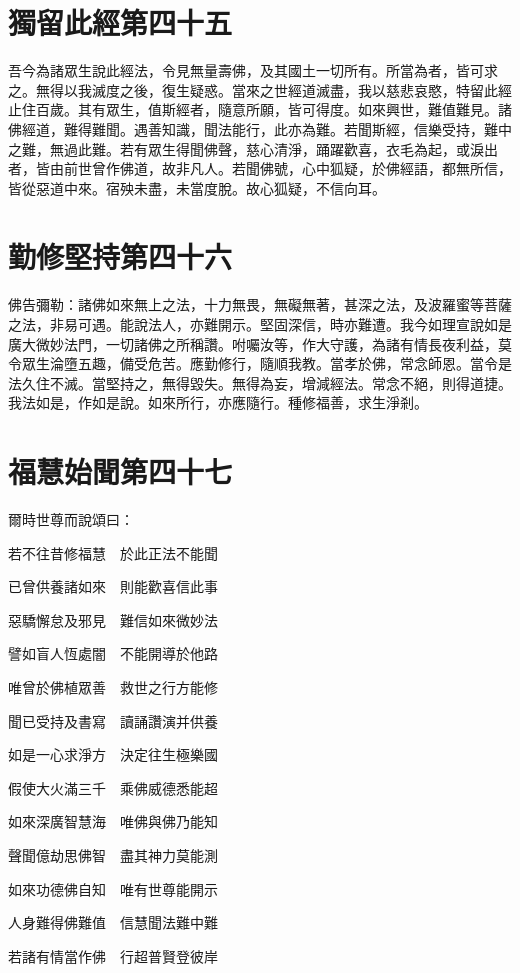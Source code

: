 \documentclass{zhvt-classic}
\begin{document}
\chapter*{獨留此經第四十五}

吾今為諸眾生說此經法，令見無量壽佛，及其國土一切所有。所當為者，皆可求之。無得以我滅度之後，復生疑惑。當來之世經道滅盡，我以慈悲哀愍，特留此經止住百歲。其有眾生，值斯經者，隨意所願，皆可得度。如來興世，難值難見。諸佛經道，難得難聞。遇善知識，聞法能行，此亦為難。若聞斯經，信樂受持，難中之難，無過此難。若有眾生得聞佛聲，慈心清淨，踊躍歡喜，衣毛為起，或淚出者，皆由前世曾作佛道，故非凡人。若聞佛號，心中狐疑，於佛經語，都無所信，皆從惡道中來。宿殃未盡，未當度脫。故心狐疑，不信向耳。

\chapter*{勤修堅持第四十六}

佛告彌勒：諸佛如來無上之法，十力無畏，無礙無著，甚深之法，及波羅蜜等菩薩之法，非易可遇。能說法人，亦難開示。堅固深信，時亦難遭。我今如理宣說如是廣大微妙法門，一切諸佛之所稱讚。咐囑汝等，作大守護，為諸有情長夜利益，莫令眾生淪墮五趣，備受危苦。應勤修行，隨順我教。當孝於佛，常念師恩。當令是法久住不滅。當堅持之，無得毀失。無得為妄，增減經法。常念不絕，則得道捷。我法如是，作如是說。如來所行，亦應隨行。種修福善，求生淨剎。

\chapter*{福慧始聞第四十七}

爾時世尊而說頌曰：

若不往昔修福慧　於此正法不能聞

已曾供養諸如來　則能歡喜信此事

惡驕懈怠及邪見　難信如來微妙法

譬如盲人恆處闇　不能開導於他路

唯曾於佛植眾善　救世之行方能修

聞已受持及書寫　讀誦讚演并供養

如是一心求淨方　決定往生極樂國

假使大火滿三千　乘佛威德悉能超

如來深廣智慧海　唯佛與佛乃能知

聲聞億劫思佛智　盡其神力莫能測

如來功德佛自知　唯有世尊能開示

人身難得佛難值　信慧聞法難中難

若諸有情當作佛　行超普賢登彼岸
\end{document}
